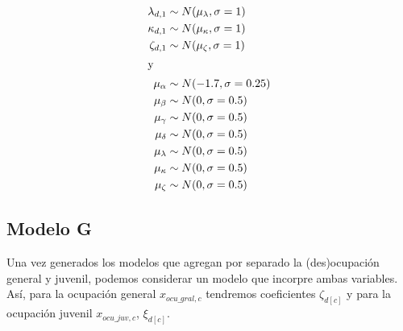 \begin{align}
\lambda_{d,1} &\sim N(\mu_{\lambda}, \sigma=1) \nonumber \\
\kappa_{d,1} &\sim N(\mu_{\kappa}, \sigma=1) \nonumber \\ 
\zeta_{d,1} &\sim N(\mu_{\zeta}, \sigma=1) \nonumber \\
\intertext{y}
\mu_{\alpha} &\sim N(-1.7,\sigma=0.25) \nonumber \\
\mu_{\beta} &\sim N(0,\sigma=0.5) \nonumber \\
\mu_{\gamma} &\sim N(0,\sigma=0.5) \nonumber \\
\mu_{\delta} &\sim N(0,\sigma=0.5) \nonumber \\
\mu_{\lambda} &\sim N(0,\sigma=0.5) \nonumber \\
\mu_{\kappa} &\sim N(0,\sigma=0.5) \nonumber \\
\mu_{\zeta} &\sim N(0,\sigma=0.5) \nonumber
\end{align}

\subsection*{Modelo G}

Una vez generados los modelos que agregan por separado la (des)ocupación general y juvenil, podemos considerar un modelo que incorpre ambas variables. Así, para la ocupación general $x_{ocu\_gral,c}$ tendremos coeficientes $\zeta_{d[c]}$ y para la ocupación juvenil $x_{ocu\_juv,c}$, $\xi_{d[c]}$. 

